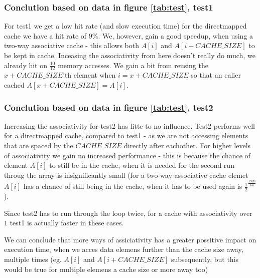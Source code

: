 \subsubsection{Conclution based on data in figure \ref{tab:test}, test1}
For test1 we get a low hit rate (and slow execution time) for the directmapped
cache we have a hit rate of $9\%$. We, however, gain a good speedup, when using
a two-way associative cache - this allows both $A[i]$ and $A[i + CACHE\_SIZE]$
to be kept in cache. Inceasing the associativity from here doesn't really do
much, we already hit on $\frac{10}{12}$ memory accesses. We gain a bit from
reusing the $x + CACHE\_SIZE$'th element when $i = x + CACHE\_SIZE$ so that an
ealier cached $A[x + CACHE\_SIZE] = A[i]$.

\subsubsection{Conclution based on data in figure \ref{tab:test}, test2}
Increasing the associativity for test2 has litte to no influence. Test2 performs
well for a directmapped cache, compared to test1 - as we are not accessing
elements that are spaced by the $CACHE\_SIZE$ directly after eachother. For
higher levels of associativity we gain no increased performance - this is
because the chance of element $A[i]$ to still be in the cache, when it is needed
for the second run throug the array is insignificantly small (for a two-way
associative cache elemet $A[i]$ has a chance of still being in the cache, when
it has to be used again is $\frac{1}{2}^\frac{1920}{64}$).

Since test2 has to run through the loop twice, for a cache with associativity
over $1$ test1 is actually faster in these cases.

We can conclude that more ways of assiciativity has a greater possitive impact
on execution time, when we acces data elemens further than the cache size
away, multiple times (eg. $A[i]$ and $A[i + CACHE\_SIZE]$ subsequently, but
this would be true for multiple elemens a cache size or more away too)

